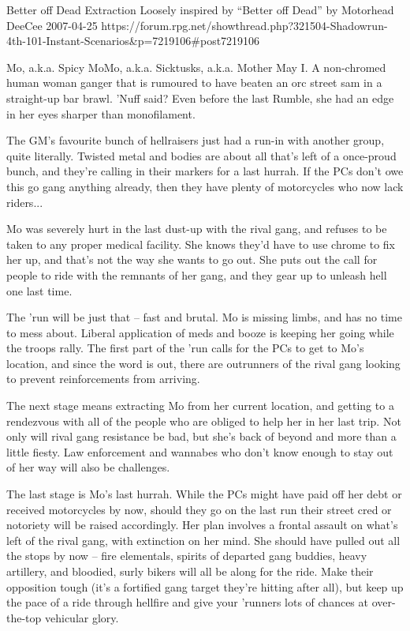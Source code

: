\begin{scenario}{Better off Dead}
	{Extraction}
	{Loosely inspired by ``Better off Dead'' by Motorhead}
	{DeeCee}
	{2007-04-25}
	{https://forum.rpg.net/showthread.php?321504-Shadowrun-4th-101-Instant-Scenarios\&p=7219106\#post7219106}

 Mo, a.k.a. Spicy MoMo, a.k.a. Sicktusks, a.k.a. Mother May I. A non-chromed human woman ganger that is rumoured to have beaten an orc street sam in a straight-up bar brawl. 'Nuff said? Even before the last Rumble, she had an edge in her eyes sharper than monofilament.

\synopsis The GM's favourite bunch of hellraisers just had a run-in with another group, quite literally. Twisted metal and bodies are about all that's left of a once-proud bunch, and they're calling in their markers for a last hurrah. If the PCs don't owe this go gang anything already, then they have plenty of motorcycles who now lack riders...

Mo was severely hurt in the last dust-up with the rival gang, and refuses to be taken to any proper medical facility. She knows they'd have to use chrome to fix her up, and that's not the way she wants to go out. She puts out the call for people to ride with the remnants of her gang, and they gear up to unleash hell one last time.

The 'run will be just that – fast and brutal. Mo is missing limbs, and has no time to mess about. Liberal application of meds and booze is keeping her going while the troops rally. The first part of the 'run calls for the PCs to get to Mo's location, and since the word is out, there are outrunners of the rival gang looking to prevent reinforcements from arriving.

The next stage means extracting Mo from her current location, and getting to a rendezvous with all of the people who are obliged to help her in her last trip. Not only will rival gang resistance be bad, but she's back of beyond and more than a little fiesty. Law enforcement and wannabes who don't know enough to stay out of her way will also be challenges.

The last stage is Mo's last hurrah. While the PCs might have paid off her debt or received motorcycles by now, should they go on the last run their street cred or notoriety will be raised accordingly. Her plan involves a frontal assault on what's left of the rival gang, with extinction on her mind. She should have pulled out all the stops by now – fire elementals, spirits of departed gang buddies, heavy artillery, and bloodied, surly bikers will all be along for the ride. Make their opposition tough (it's a fortified gang target they're hitting after all), but keep up the pace of a ride through hellfire and give your 'runners lots of chances at over-the-top vehicular glory. 

\end{scenario}